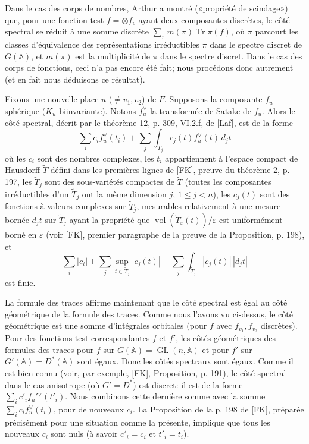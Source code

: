\documentclass[10pt]{article}
\newcommand{\Adele}{\mathbb A}
\newcommand{\GL}{\operatorname{GL}}
\newcommand{\Tr}{\operatorname{Tr}}
\theoremstyle{deligne}
\newcommand{\vol}{\operatorname{vol}}
\begin{document}
Dans le cas des corps de nombres, Arthur a montré («propriété de scindage») que, pour une fonction test $f=\otimes f_v$ ayant deux composantes discrètes, le côté spectral se réduit à une somme discrète $\sum_\pi m(\pi)\Tr\pi(f)$, où $\pi$ parcourt les classes d'équivalence des représentations irréductibles $\pi$ dans le spectre discret de $G(\Adele)$, et $m(\pi)$ est la multiplicité de $\pi$ dans le spectre discret. Dans le cas des corps de fonctions, ceci n'a pas encore été fait; nous procédons donc autrement (et en fait nous déduisons ce résultat).

Fixons une nouvelle place $u$ ($\ne v_1,v_2$) de $F$. Supposons la composante $f_u$ sphérique ($K_u$-biinvariante). Notons $f_u^{\vee}$ la transformée de Satake de $f_u$. Alors le côté spectral, décrit par le théorème 12, p. 309, VI.2.f, de [Laf], est de la forme
\[
\sum_i c_if_u^{\vee}(t_i)+\sum_j\int_{\widetilde T_j}c_j(t)f_u^{\vee}(t)\,d_jt
\]
où les $c_i$ sont des nombres complexes, les $t_i$ appartiennent à l'espace compact de Hausdorff $\widetilde T$ défini dans les premières lignes de [FK], preuve du théorème 2, p. 197, les $\widetilde T_j$ sont des sous-variétés compactes de $\widetilde T$ (toutes les composantes irréductibles d'un $\widetilde T_j$ ont la même dimension $j$, $1\le j<n$), les $c_j(t)$ sont des fonctions à valeurs complexes sur $\widetilde T_j$, mesurables relativement à une mesure bornée $d_jt$ sur $\widetilde T_j$ ayant la propriété que $\vol(\widetilde T_{\varepsilon}(t))/\varepsilon$ est uniformément borné en $\varepsilon$ (voir [FK], premier paragraphe de la preuve de la Proposition, p. 198), et
\[
\sum_i |c_i|+\sum_j\sup_{t\in\widetilde T_j}|c_j(t)|+\sum_j\int_{\widetilde T_j}|c_j(t)|\,|d_jt|
\]
est finie.

La formule des traces affirme maintenant que le côté spectral est égal au côté géométrique de la formule des traces. Comme nous l'avons vu ci-dessus, le côté géométrique est une somme d'intégrales orbitales (pour $f$ avec $f_{v_1},f_{v_2}$ discrètes). Pour des fonctions test correspondantes $f$ et $f'$, les côtés géométriques des formules des traces pour $f$ sur $G(\Adele)=\GL(n,\Adele)$ et pour $f'$ sur $G'(\Adele)=D^*(\Adele)$ sont égaux. Donc les côtés spectraux sont égaux. Comme il est bien connu (voir, par exemple, [FK], Proposition, p. 191), le côté spectral dans le cas anisotrope (où $G'=D^*$) est discret: il est de la forme $\sum_i c'_if_u'{}^{\vee}(t'_i)$. Nous combinons cette dernière somme avec la somme $\sum_i c_if_u^{\vee}(t_i)$, pour de nouveaux $c_i$. La Proposition de la p. 198 de [FK], préparée précisément pour une situation comme la présente, implique que tous les nouveaux $c_i$ sont nuls (à savoir $c'_i=c_i$ et $t'_i=t_i$).
\end{document}
